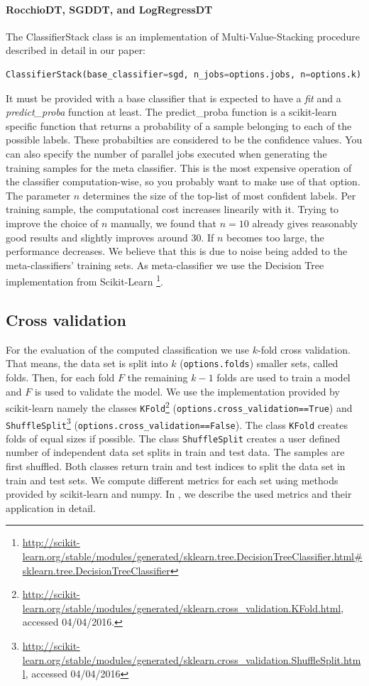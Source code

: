 \documentclass{article}
\begin{document}
\paragraph{RocchioDT, SGDDT, and LogRegressDT}
The ClassifierStack class is an implementation of Multi-Value-Stacking procedure described in detail in our paper:
\begin{lstlisting}[language=Python]
ClassifierStack(base_classifier=sgd, n_jobs=options.jobs, n=options.k)
\end{lstlisting}
It must be provided with a base classifier that is expected to have a \emph{fit} and a \emph{predict\_proba} function at least.
The predict\_proba function is a scikit-learn specific function that returns a probability of a sample belonging to each of the
possible labels. These probabilties are considered to be the confidence values.
You can also specify the number of parallel jobs executed when generating the training samples for the meta classifier. This is
the most expensive operation of the classifier computation-wise, so you probably want to make use of that option.
The parameter $n$ determines the size of the top-list of most confident labels. Per training sample, the computational cost increases
linearily with it. Trying to improve the choice of $n$ manually, we found that $n = 10$ already gives reasonably good results and slightly
improves around 30. If $n$ becomes too large, the performance decreases. We believe that this is due to noise being added to the
meta-classifiers' training sets.
As meta-classifier we use the Decision Tree implementation from Scikit-Learn
\footnote{\url{http://scikit-learn.org/stable/modules/generated/sklearn.tree.DecisionTreeClassifier.html#sklearn.tree.DecisionTreeClassifier}}.

\subsection{Cross validation}
For the evaluation of the computed classification we use $k$-fold cross validation. That means, the data set is split into $k$
(\texttt{options.folds}) smaller sets, called folds. Then, for each fold $F$ the remaining $k-1$ folds are used to train a model
and $F$ is used to validate the model. We use the implementation provided by scikit-learn
namely the classes \texttt{KFold}\footnote{
  \url{http://scikit-learn.org/stable/modules/generated/sklearn.cross_validation.KFold.html}, accessed 04/04/2016.}
(\texttt{options.cross\_validation==True}) and \texttt{ShuffleSplit}\footnote{
  \url{http://scikit-learn.org/stable/modules/generated/sklearn.cross_validation.ShuffleSplit.html}, accessed 04/04/2016}
(\texttt{options.cross\_validation==False}). The class \texttt{KFold} creates folds of equal sizes if possible. The class \texttt{ShuffleSplit}
creates a user defined number of independent data set splits in train and test data. The samples are first shuffled.
Both classes return train and test indices to split the data set in train and test sets.
We compute different metrics for each set using methods provided by scikit-learn and numpy. In ,
we describe the used metrics and their application in detail.
\end{document}
